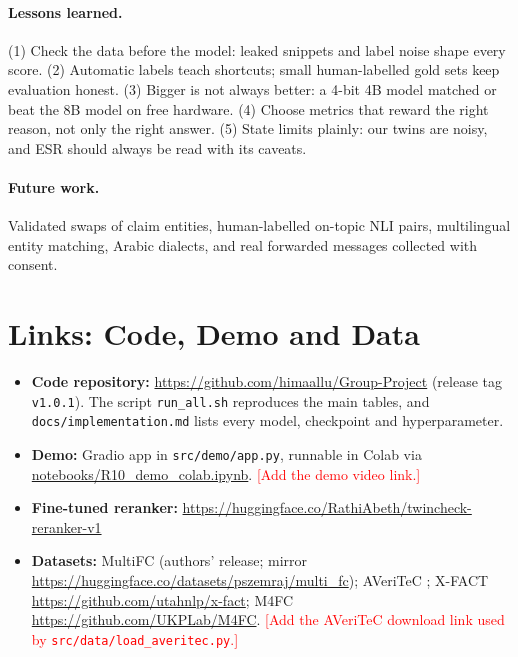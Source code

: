 \paragraph{Lessons learned.}
(1) Check the data before the model: leaked snippets and label noise shape every score. (2) Automatic labels teach shortcuts; small human-labelled gold sets keep evaluation honest. (3) Bigger is not always better: a 4-bit 4B model matched or beat the 8B model on free hardware. (4) Choose metrics that reward the right reason, not only the right answer. (5) State limits plainly: our  twins are noisy, and ESR should always be read with its caveats.

\paragraph{Future work.}
Validated swaps of claim entities, human-labelled on-topic NLI pairs, multilingual entity matching, Arabic dialects, and real forwarded messages collected with consent.

\section{Links: Code, Demo and Data}
\begin{itemize}\setlength{\itemsep}{1pt}
  \item \textbf{Code repository:} \url{https://github.com/himaallu/Group-Project} (release tag \texttt{v1.0.1}). The script \texttt{run\_all.sh} reproduces the main tables, and \texttt{docs/implementation.md} lists every model, checkpoint and hyperparameter.
  \item \textbf{Demo:} Gradio app in \texttt{src/demo/app.py}, runnable in Colab via \url{notebooks/R10_demo_colab.ipynb}. \textcolor{red}{[Add the demo video link.]}
  \item \textbf{Fine-tuned reranker:} \url{https://huggingface.co/RathiAbeth/twincheck-reranker-v1}
  \item \textbf{Datasets:} MultiFC \citep{augenstein2019multifc} (authors' release; mirror \url{https://huggingface.co/datasets/pszemraj/multi_fc}); AVeriTeC \citep{schlichtkrull2023averitec}; X-FACT \url{https://github.com/utahnlp/x-fact}; M4FC \url{https://github.com/UKPLab/M4FC}. \textcolor{red}{[Add the AVeriTeC download link used by \texttt{src/data/load\_averitec.py}.]}
\end{itemize}

